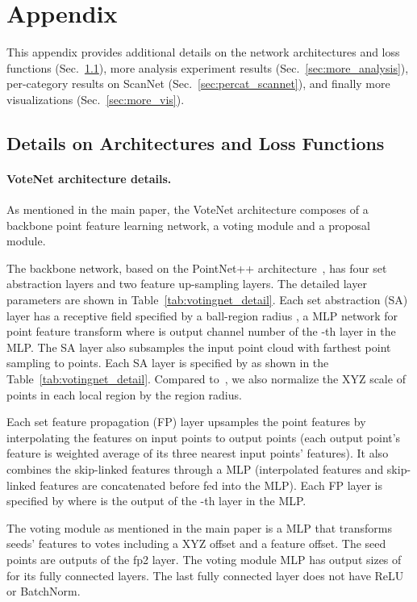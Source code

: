 \documentclass[10pt,twocolumn,letterpaper]{article}
\newcommand\votenet{VoteNet}
\begin{document}
\newpage
\appendix
\section{Appendix}
\label{sec:overview}
This appendix provides additional details on the network architectures and loss functions (Sec.~\ref{sec:arch_details}), more analysis experiment results (Sec.~\ref{sec:more_analysis}), per-category results on ScanNet (Sec.~\ref{sec:percat_scannet}), and finally more visualizations (Sec.~\ref{sec:more_vis}).


\subsection{Details on Architectures and Loss Functions}
\label{sec:arch_details}

\paragraph{\votenet{} architecture details.} As mentioned in the main paper, the \votenet{} architecture composes of a backbone point feature learning network, a voting module and a proposal module.

The backbone network, based on the PointNet++ architecture~\cite{qi2017pointnetplusplus}, has four set abstraction layers and two feature up-sampling layers. The detailed layer parameters are shown in Table~\ref{tab:votingnet_detail}. Each set abstraction (SA) layer has a receptive field specified by a ball-region radius , a MLP network for point feature transform  where  is output channel number of the -th layer in the MLP. The SA layer also subsamples the input point cloud with farthest point sampling to  points. Each SA layer is specified by  as shown in the Table~\ref{tab:votingnet_detail}. Compared to~\cite{qi2017pointnetplusplus}, we also normalize the XYZ scale of points in each local region by the region radius.

Each set feature propagation (FP) layer upsamples the point features by interpolating the features on input points to output points (each output point's feature is weighted average of its three nearest input points' features). It also combines the skip-linked features through a MLP (interpolated features and skip-linked features are concatenated before fed into the MLP). Each FP layer is specified by  where  is the output of the -th layer in the MLP.

The voting module as mentioned in the main paper is a MLP that transforms seeds' features to votes including a XYZ offset and a feature offset. The seed points are outputs of the fp2 layer. The voting module MLP has output sizes of  for its fully connected layers. The last fully connected layer does not have ReLU or BatchNorm.
\end{document}
